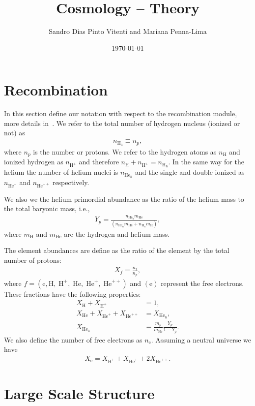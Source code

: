 \documentclass[a4paper,twocolumn]{article}
\title{Cosmology -- Theory}
\author{Sandro Dias Pinto Vitenti and Mariana Penna-Lima}
\date{\today}
\newcommand{\He}{\text{He}}
\newcommand{\Hen}{\He_\text{n}}
\newcommand{\Hy}{\text{H}}
\newcommand{\Hyn}{\Hy_\text{n}}
\newcommand{\e}{\text{e}}
\begin{document}
\maketitle

\section{Recombination}

In this section define our notation with respect to the recombination module, more details in~\cite{Weinberg2008}. We refer to the total number of hydrogen nucleus (ionized or not) as 
\begin{align}
n_{\Hyn} \equiv n_p,
\end{align}
where $n_p$ is the number or protons. We refer to the hydrogen atoms as $n_{\Hy}$ and ionized hydrogen as $n_{\Hy^+}$ and therefore $n_{\Hy} + n_{\Hy^+} = n_{\Hyn}$. In the same way for the helium the number of helium nuclei is $n_{\Hen}$ and the single and double ionized as $n_{\He^+}$ and $n_{\He^{++}}$ respectively.

We also we the helium primordial abundance as the ratio of the helium mass to the total baryonic mass, i.e.,
\hypertarget{def_Y_p}{}
\begin{align}
Y_p = \frac{n_{\Hen} m_{\He}}{(n_{\Hen} m_{\He} + n_{\Hyn} m_{\Hy})},
\end{align}
where $m_\Hy$ and $m_{\He}$ are the hydrogen and helium mass.

The element abundances are define as the ratio of the element by the total number of protons:
\begin{align}
X_{f} = \frac{n_{f}}{n_p}, 
\end{align}
where $f = (\e, \Hy,\;\Hy^+,\;\He,\;\He^+,\;\He^{++})$ and $(\e)$ represent the free electrons. These fractions have the following properties:
\begin{align}
X_\Hy + X_{\Hy^+} &= 1, \\
X_{\He} + X_{\He^+} + X_{\He^{++}} &= X_{\Hen}, \\
X_{\Hen} &\equiv \frac{m_p}{m_{\He}}\frac{Y_p}{1-Y_p}.
\end{align}
We also define the number of free electrons as $n_\e$. Assuming a neutral universe we have 
\begin{align}
X_\e = X_{\Hy^+} + X_{\He^{+}} + 2X_{\He^{++}}.
\end{align}

\section{Large Scale Structure}
\end{document}
